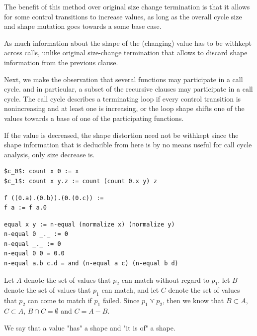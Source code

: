 The benefit of this method over original size change termination is that it
allows for some control transitions to increase values, as long as the overall
cycle size and shape mutation goes towards a some base case.

As much information about the shape of the (changing) value has to be withkept
across calls, unlike original size-change termination that allows to discard
shape information from the previous clause.

Next, we make the observation that several functions may participate in a call
cycle.  and in particular, a subset of the recursive clauses may participate in
a call cycle. The call cycle describes a terminating loop if every control
transition is nonincreasing and at least one is increasing, or the loop shape
shifts one of the values towards a base of one of the participating functions.

If the value is decreased, the shape distortion need not be withkept since the
shape information that is deducible from here is by no means useful for call
cycle analysis, only size decrease is.

\begin{lstlisting}
$c_0$: count x 0 := x
$c_1$: count x y.z := count (count 0.x y) z
\end{lstlisting}

\begin{lstlisting}
f ((0.a).(0.b)).(0.(0.c)) := 
f a := f a.0
\end{lstlisting}

\begin{verbatim}
equal x y := n-equal (normalize x) (normalize y)
n-equal 0 _._ := 0
n-equal _._ := 0
n-equal 0 0 = 0.0
n-equal a.b c.d = and (n-equal a c) (n-equal b d)
\end{verbatim}

Let $A$ denote the set of values that $p_2$ can
match without regard to $p_1$, let $B$ denote the set of values that $p_1$ can
match, and let $C$ denote the set of values that $p_2$ can come to match if
$p_1$ failed. Since $p_1\curlyvee p_2$, then we know that $B\subset A$,
$C\subset A$, $B\cap C=\emptyset$ and $C=A-B$.



We say that a value "has" a shape and "it is of" a shape.
